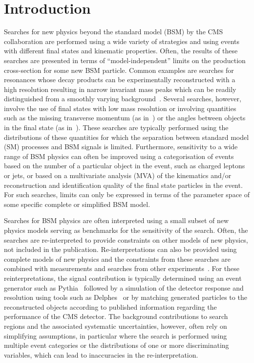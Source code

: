 \section{Introduction}
\label{sec:intro}

Searches for new physics beyond the standard model (BSM) by the CMS collaboration are performed using a wide variety of 
strategies and using events with different final states and kinematic properties.  Often, 
the results of these searches are presented in terms of ``model-independent'' limits on the production 
cross-section for some new BSM particle. Common examples are searches for resonances whose decay products 
can be experimentally reconstructed with a high resolution resulting in narrow invariant mass peaks which can be readily distinguished from 
a smoothly varying background~\cite{Khachatryan:2016yec}. Several searches, however, involve the use of final states with low mass resolution or involving 
quantities such as the missing transverse momentum (as in~\cite{Khachatryan:2011tk,Khachatryan:2016mdm}) or the angles between objects in the final state (as in~\cite{Khachatryan:2015pua}). 
These searches are typically performed using the 
distributions of these quantities for which the separation between standard model (SM) processes and BSM signals is limited. Furthermore, 
sensitivity to a wide range of BSM physics can often be improved using a categorisation of events based on the number of a particular 
object in the event, such as charged leptons or jets, or based on a multivariate analysis (MVA) of the kinematics and/or reconstruction and 
identification quality of the final state particles in the event. For such searches, limits can only be expressed in terms of the 
parameter space of some specific complete or simplified BSM model.

Searches for BSM physics are often interpreted using a small subset of new physics 
models serving as benchmarks for the sensitivity of the search. Often, the searches are re-interpreted 
to provide constraints on other models of new physics, not included in the publication.
Re-interpretations can also be provided using complete models of new physics and the constraints from 
these searches are combined with measurements and searches from other experiments~\cite{mastercode}. 
For these reinterpretations, the signal contribution is typically determined using an event generator 
such as {\sc Pythia}~\cite{pythia} followed by a simulation of the detector 
response and resolution using tools such as {\sc Delphes}~\cite{delphes} or by matching generated particles to
the reconstructed objects according to published information regarding the performance of the CMS detector. 
The background contributions to search regions and the associated systematic uncertainties, however, often rely
on simplifying assumptions, in particular where the search is performed using multiple event categories or 
the distributions of one or more discriminating variables, which can lead to inaccuracies in the re-interpretation. 

